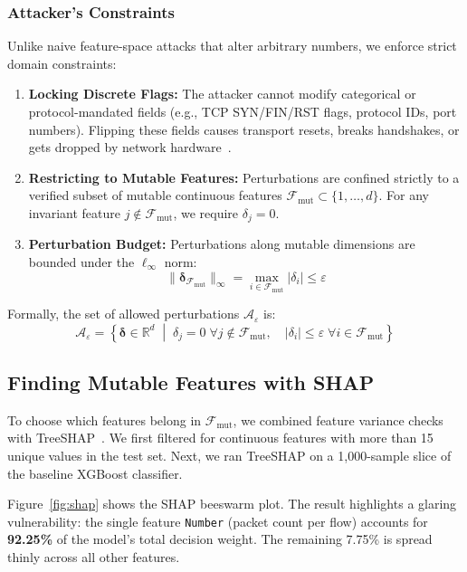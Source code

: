 \documentclass[final,5p,times,twocolumn]{elsarticle}
\begin{document}
\subsubsection{Attacker's Constraints}
Unlike naive feature-space attacks that alter arbitrary numbers, we enforce strict domain constraints:
\begin{enumerate}
    \item \textbf{Locking Discrete Flags:} The attacker cannot modify categorical or protocol-mandated fields (e.g., TCP SYN/FIN/RST flags, protocol IDs, port numbers). Flipping these fields causes transport resets, breaks handshakes, or gets dropped by network hardware~\cite{apruzzese2022modeling}.
    \item \textbf{Restricting to Mutable Features:} Perturbations are confined strictly to a verified subset of mutable continuous features $\mathcal{F}_{\text{mut}} \subset \{1, \dots, d\}$. For any invariant feature $j \notin \mathcal{F}_{\text{mut}}$, we require $\delta_j = 0$.
    \item \textbf{Perturbation Budget:} Perturbations along mutable dimensions are bounded under the $\ell_\infty$ norm:
    \begin{equation}
        \|\boldsymbol{\delta}_{\mathcal{F}_{\text{mut}}}\|_\infty = \max_{i \in \mathcal{F}_{\text{mut}}} |\delta_i| \leq \varepsilon
    \end{equation}
\end{enumerate}

Formally, the set of allowed perturbations $\mathcal{A}_\varepsilon$ is:
\begin{equation}
    \mathcal{A}_\varepsilon = \left\{ \boldsymbol{\delta} \in \mathbb{R}^d \;\middle|\; \delta_j = 0 \; \forall j \notin \mathcal{F}_{\text{mut}}, \quad |\delta_i| \leq \varepsilon \; \forall i \in \mathcal{F}_{\text{mut}} \right\}
\end{equation}

\subsection{Finding Mutable Features with SHAP}
\label{sec:shap}
To choose which features belong in $\mathcal{F}_{\text{mut}}$, we combined feature variance checks with TreeSHAP~\cite{lundberg2017shap}. We first filtered for continuous features with more than 15 unique values in the test set. Next, we ran TreeSHAP on a 1,000-sample slice of the baseline XGBoost classifier.

Figure~\ref{fig:shap} shows the SHAP beeswarm plot. The result highlights a glaring vulnerability: the single feature \texttt{Number} (packet count per flow) accounts for \textbf{92.25\%} of the model's total decision weight. The remaining 7.75\% is spread thinly across all other features.
\end{document}
